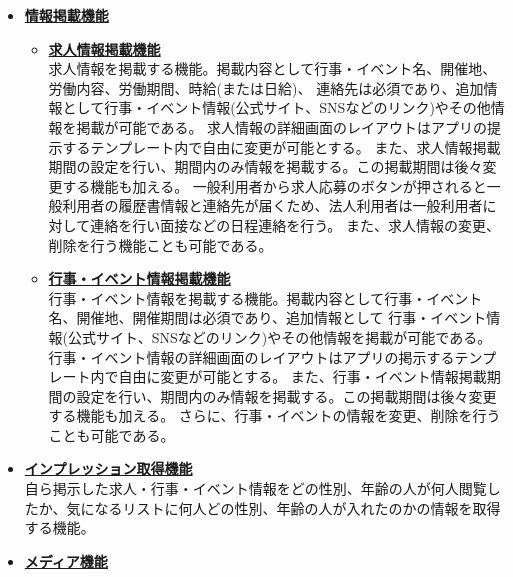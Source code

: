 \documentclass[a4paper,dvipdfmx]{jarticle}
\begin{document}
\begin{itemize}
\begin{itemize}
                  操作方法等の質問をメール形式で送信することが可能となっている。質問への回答はアプリ利用者が登録したメールアドレスへ送信される。
              \item[-] \underline{\textbf{パスワード変更機能}}\\
                  パスワードを作成条件下で任意に変更する機能。
          \end{itemize}
    \item \underline{\textbf{情報掲載機能}}
          \begin{itemize}
              \item \underline{\textbf{求人情報掲載機能}}\\
                    求人情報を掲載する機能。掲載内容として行事・イベント名、開催地、労働内容、労働期間、時給(または日給)、
                    連絡先は必須であり、追加情報として行事・イベント情報(公式サイト、SNSなどのリンク)やその他情報を掲載が可能である。
                    求人情報の詳細画面のレイアウトはアプリの提示するテンプレート内で自由に変更が可能とする。
                    また、求人情報掲載期間の設定を行い、期間内のみ情報を掲載する。この掲載期間は後々変更する機能も加える。
                    一般利用者から求人応募のボタンが押されると一般利用者の履歴書情報と連絡先が届くため、法人利用者は一般利用者に対して連絡を行い面接などの日程連絡を行う。
                    また、求人情報の変更、削除を行う機能ことも可能である。
              \item \underline{\textbf{行事・イベント情報掲載機能}}\\
                    行事・イベント情報を掲載する機能。掲載内容として行事・イベント名、開催地、開催期間は必須であり、追加情報として
                    行事・イベント情報(公式サイト、SNSなどのリンク)やその他情報を掲載が可能である。
                    行事・イベント情報の詳細画面のレイアウトはアプリの掲示するテンプレート内で自由に変更が可能とする。
                    また、行事・イベント情報掲載期間の設定を行い、期間内のみ情報を掲載する。この掲載期間は後々変更する機能も加える。
                    さらに、行事・イベントの情報を変更、削除を行うことも可能である。
          \end{itemize}
    \item \underline{\textbf{インプレッション取得機能}}\\
          自ら掲示した求人・行事・イベント情報をどの性別、年齢の人が何人閲覧したか、気になるリストに何人どの性別、年齢の人が入れたのかの情報を取得する機能。
    \item \underline{\textbf{メディア機能}}

\end{itemize}
\end{document}
